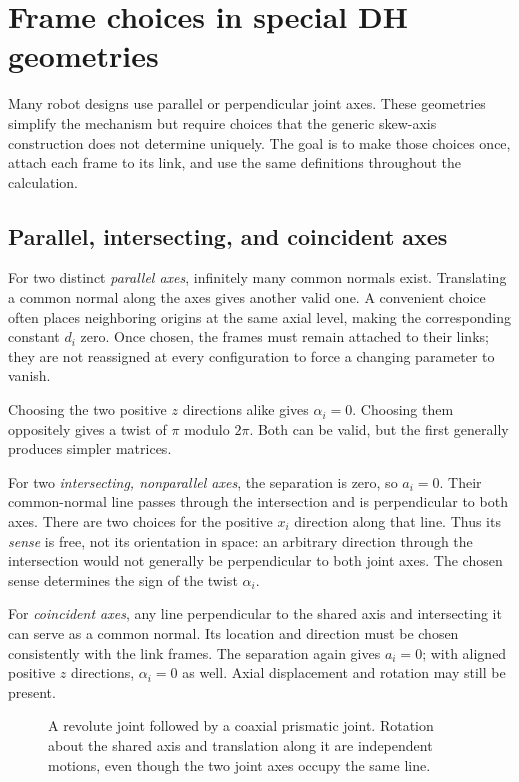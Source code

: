 \clearpage
\section{Frame choices in special DH geometries}
\label{sec:l10-dh-special}
Many robot designs use parallel or perpendicular joint axes. These
geometries simplify the mechanism but require choices that the generic
skew-axis construction does not determine uniquely. The goal is to make
those choices once, attach each frame to its link, and use the same
definitions throughout the calculation.

\subsection{Parallel, intersecting, and coincident axes}
For two distinct \emph{parallel axes}, infinitely many common normals
exist. Translating a common normal along the axes gives another valid
one. A convenient choice often places neighboring origins at the same
axial level, making the corresponding constant $d_i$ zero. Once chosen,
the frames must remain attached to their links; they are not reassigned
at every configuration to force a changing parameter to vanish.

Choosing the two positive $z$ directions alike gives $\alpha_i=0$.
Choosing them oppositely gives a twist of $\pi$ modulo $2\pi$. Both can
be valid, but the first generally produces simpler matrices.

For two \emph{intersecting, nonparallel axes}, the separation is zero,
so $a_i=0$. Their common-normal line passes through the intersection and
is perpendicular to both axes. There are two choices for the positive
$x_i$ direction along that line. Thus its \emph{sense} is free, not its
orientation in space: an arbitrary direction through the intersection
would not generally be perpendicular to both joint axes. The chosen
sense determines the sign of the twist $\alpha_i$.

For \emph{coincident axes}, any line perpendicular to the shared axis
and intersecting it can serve as a common normal. Its location and
direction must be chosen consistently with the link frames. The
separation again gives $a_i=0$; with aligned positive $z$ directions,
$\alpha_i=0$ as well. Axial displacement and rotation may still be present.

\begin{figure}[htbp]
\centering
\caption{A revolute joint followed by a coaxial prismatic joint. Rotation
about the shared axis and translation along it are independent motions,
even though the two joint axes occupy the same line.}
\label{fig:l10-dh-coaxial}
\end{figure}

